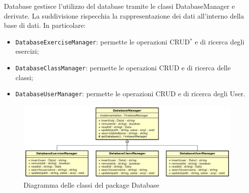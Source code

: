 Database gestisce l'utilizzo del database tramite le classi DatabaseManager e derivate. La suddivisione rispecchia la rappresentazione dei dati all'interno della base di dati. In particolare:
\begin{itemize}
	\item \texttt{DatabaseExerciseManager}: permette le operazioni CRUD$^{*}$ e di ricerca degli esercizi;
	\item \texttt{DatabaseClassManager}: permette le operazioni CRUD e di ricerca delle classi;
	\item \texttt{DatabaseUserManager}: permette le operazioni CRUD e di ricerca degli User.
\end{itemize}

\begin{figure}[h]
	\includegraphics[scale=0.5]{images/DatabaseManager.png}
	\caption{Diagramma delle classi del package Database}
\end{figure}